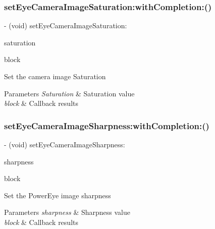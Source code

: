 \subsubsection{\texorpdfstring{set\+Eye\+Camera\+Image\+Saturation\+:with\+Completion\+:()}{setEyeCameraImageSaturation:withCompletion:()}}
{\footnotesize\ttfamily -\/ (void) set\+Eye\+Camera\+Image\+Saturation\+: \begin{DoxyParamCaption}\item[{(N\+S\+Integer)}]{saturation }\item[{withCompletion:(P\+V\+Completion\+Block)}]{block }\end{DoxyParamCaption}}

Set the camera image Saturation


\begin{DoxyParams}{Parameters}
{\em Saturation} & Saturation value \\
\hline
{\em block} & Callback results \\
\hline
\end{DoxyParams}
\mbox{\label{interface_p_v_eye_camera_a6174bc9daacd3873ec14d368f36b5586}} 
\subsubsection{\texorpdfstring{set\+Eye\+Camera\+Image\+Sharpness\+:with\+Completion\+:()}{setEyeCameraImageSharpness:withCompletion:()}}
{\footnotesize\ttfamily -\/ (void) set\+Eye\+Camera\+Image\+Sharpness\+: \begin{DoxyParamCaption}\item[{(N\+S\+Integer)}]{sharpness }\item[{withCompletion:(P\+V\+Completion\+Block)}]{block }\end{DoxyParamCaption}}

Set the Power\+Eye image sharpness


\begin{DoxyParams}{Parameters}
{\em sharpness} & Sharpness value \\
\hline
{\em block} & Callback results \\
\hline
\end{DoxyParams}
\mbox{\label{interface_p_v_eye_camera_a2c8852b36ca981eafc68b18f142c96eb}} 
